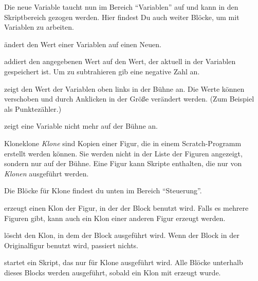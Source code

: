 \documentclass[lerntheke,12pt,a5paper,landscape]{arbeitsblatt}
\begin{document}
\begin{loesungskarte}[Variablen]
	Die neue Variable taucht nun im Bereich \enquote{Variablen} auf und kann in den Skriptbereich gezogen werden. Hier findest Du auch weiter Blöcke, um mit Variablen zu arbeiten.

	 ändert den Wert einer Variablen auf einen Neuen.

	 addiert den angegebenen Wert auf den Wert, der aktuell in der Variablen gespeichert ist. Um zu subtrahieren gib eine negative Zahl an.

	 zeigt den Wert der Variablen oben links in der Bühne an. Die Werte können verschoben und durch Anklicken in der Größe verändert werden. (Zum Beispiel als Punktezähler.)

	 zeigt eine Variable nicht mehr auf der Bühne an.
\end{loesungskarte}

\begin{hilfekarte}{Klone}{klone}
	\emph{Klone} sind Kopien einer Figur, die in einem Scratch-Programm erstellt werden können. Sie werden nicht in der Liste der Figuren angezeigt, sondern nur auf der Bühne. Eine Figur kann Skripte enthalten, die nur von \emph{Klonen} ausgeführt werden.

	Die Blöcke für Klone findest du unten im Bereich \enquote{Steuerung}.

	 erzeugt einen Klon der Figur, in der der Block benutzt wird. Falls es mehrere Figuren gibt, kann auch ein Klon einer anderen Figur erzeugt werden.

	 löscht den Klon, in dem der Block ausgeführt wird. Wenn der Block in der Originalfigur benutzt wird, passiert nichts.

	 startet ein Skript, das nur für Klone ausgeführt wird. Alle Blöcke unterhalb dieses Blocks werden ausgeführt, sobald ein Klon mit  erzeugt wurde.
\end{hilfekarte}
\end{document}
